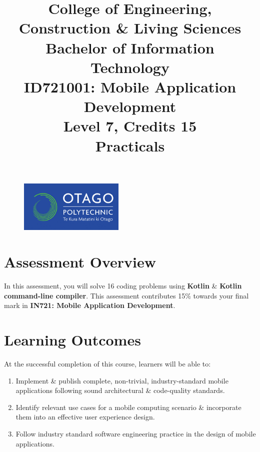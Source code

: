 \documentclass{article}
\author{}
\begin{document}
\begin{figure}
  \centering
  \includegraphics[width=50mm]{../../resources/img/logo.png}
\end{figure}

\title{College of Engineering, Construction \& Living Sciences\\Bachelor of Information Technology\\ID721001: Mobile Application Development\\Level 7, Credits 15\\\textbf{Practicals}}
\date{}
\maketitle

\section*{Assessment Overview}
In this assessment, you will solve 16 coding problems using \textbf{Kotlin} \& \textbf{Kotlin command-line compiler}. This assessment contributes 15\% towards your final mark in \textbf{IN721: Mobile Application Development}.

\section*{Learning Outcomes}
At the successful completion of this course, learners will be able to:
\begin{enumerate}
  \item Implement \& publish complete, non-trivial, industry-standard mobile applications following sound architectural \& code-quality standards.
  \item Identify relevant use cases for a mobile computing scenario \& incorporate them into an effective user experience design.
  \item Follow industry standard software engineering practice in the design of mobile applications.
\end{enumerate}
\end{document}
